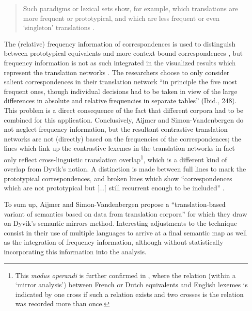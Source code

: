 \begin{quote}
Such paradigms or lexical sets show, for example, which translations are more frequent or prototypical, and which are less frequent or even ‘singleton’ translations \citep[1785-1786]{aijmer_model_2004}.
\end{quote}

The (relative) frequency information of correspondences is used to distinguish between prototypical equivalents and more context-bound correspondences \citep[8]{simon-vandenbergen_semantic_2007}, but frequency information is not as such integrated in the visualized results which represent the translation networks \citep[250-253]{simon-vandenbergen_semantic_2007}. The researchers choose to only consider salient correspondences in their translation network “in principle the five most frequent ones, though individual decisions had to be taken in view of the large differences in absolute and relative frequencies in separate tables” (Ibid., 248). This problem is a direct consequence of the fact that different corpora had to be combined for this application. Conclusively, Aijmer and Simon-Vandenbergen do not neglect frequency information, but the resultant contrastive translation networks are not (directly) based on the frequencies of the correspondences; the lines which link up the contrastive lexemes in the translation networks in fact only reflect cross-linguistic translation overlap\footnote{This \textit{modus operandi} is further confirmed in \citet[93-94]{simon-vandenbergen_english_2013}, where the relation (within a ‘mirror analysis’) between French or Dutch equivalents and English lexemes is indicated by one cross if such a relation exists and two crosses is the relation was recorded more than once.}, which is a different kind of overlap from Dyvik’s notion. A distinction is made between full lines to mark the prototypical correspondences, and broken lines which show “correspondences which are not prototypical but [...] still recurrent enough to be included” \citep[248]{simon-vandenbergen_semantic_2007}.

To sum up, Aijmer and Simon-Vandenbergen propose a “translation-based variant of semantics based on data from translation corpora” \citep[7]{simon-vandenbergen_semantic_2007} for which they draw on Dyvik’s semantic mirrors method. Interesting adjustments to the technique consist in their use of multiple languages to arrive at a final semantic map as well as the integration of frequency information, although without statistically incorporating this information into the analysis.

